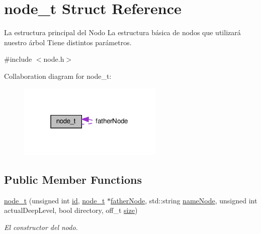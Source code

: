 \hypertarget{structnode__t}{}\section{node\+\_\+t Struct Reference}
\label{structnode__t}


La estructura principal del Nodo La estructura básica de nodos que utilizará nuestro árbol Tiene distintos parámetros.  




{\ttfamily \#include $<$node.\+h$>$}



Collaboration diagram for node\+\_\+t\+:
\nopagebreak
\begin{figure}[H]
\begin{center}
\leavevmode
\includegraphics[width=196pt]{structnode__t__coll__graph}
\end{center}
\end{figure}
\subsection*{Public Member Functions}
\begin{DoxyCompactItemize}
\item 
\hyperlink{structnode__t_a91cf3f91cff0e714a148090202a9cb47}{node\+\_\+t} (unsigned int \hyperlink{structnode__t_a3d32f150f8a692d43e545b8b53eb856e}{id}, \hyperlink{structnode__t}{node\+\_\+t} $\ast$\hyperlink{structnode__t_a677649fc87677fd268566458fabf99db}{father\+Node}, std\+::string \hyperlink{structnode__t_a202c45b136037819d05bdd73728de399}{name\+Node}, unsigned int actual\+Deep\+Level, bool directory, off\+\_\+t \hyperlink{structnode__t_a692153fd99c77b0a2a2e06571abd41f2}{size})
\begin{DoxyCompactList}\small\item\em El constructor del nodo. \end{DoxyCompactList}\end{DoxyCompactItemize}
